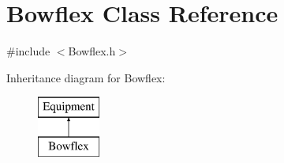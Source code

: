 \hypertarget{class_bowflex}{}\section{Bowflex Class Reference}
\label{class_bowflex}


{\ttfamily \#include $<$Bowflex.\+h$>$}

Inheritance diagram for Bowflex\+:\begin{figure}[H]
\begin{center}
\leavevmode
\includegraphics[height=2.000000cm]{class_bowflex}
\end{center}
\end{figure}

